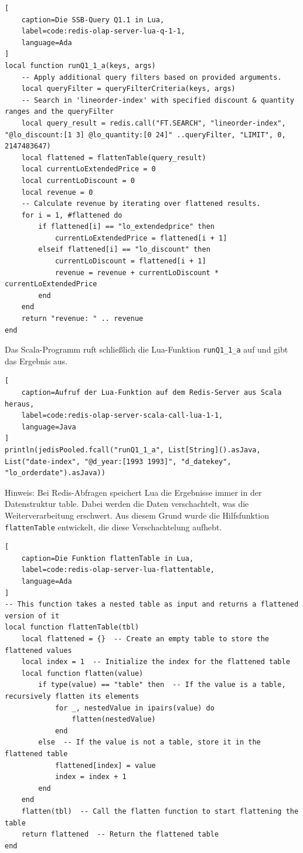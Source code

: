 \begin{lstlisting}[
    caption=Die SSB-Query Q1.1 in Lua,
    label=code:redis-olap-server-lua-q-1-1,
    language=Ada
]
local function runQ1_1_a(keys, args)
    -- Apply additional query filters based on provided arguments.
    local queryFilter = queryFilterCriteria(keys, args)
    -- Search in 'lineorder-index' with specified discount & quantity ranges and the queryFilter
    local query_result = redis.call("FT.SEARCH", "lineorder-index", "@lo_discount:[1 3] @lo_quantity:[0 24]" ..queryFilter, "LIMIT", 0, 2147483647)
    local flattened = flattenTable(query_result)
    local currentLoExtendedPrice = 0
    local currentLoDiscount = 0
    local revenue = 0
    -- Calculate revenue by iterating over flattened results.
    for i = 1, #flattened do
        if flattened[i] == "lo_extendedprice" then
            currentLoExtendedPrice = flattened[i + 1]
        elseif flattened[i] == "lo_discount" then
            currentLoDiscount = flattened[i + 1]
            revenue = revenue + currentLoDiscount * currentLoExtendedPrice
        end
    end
    return "revenue: " .. revenue
end
\end{lstlisting}

Das Scala-Programm ruft schließlich die Lua-Funktion \lstinline|runQ1_1_a| auf und gibt das Ergebnis aus.

\begin{lstlisting}[
    caption=Aufruf der Lua-Funktion auf dem Redis-Server aus Scala heraus,
    label=code:redis-olap-server-scala-call-lua-1-1,
    language=Java
]
println(jedisPooled.fcall("runQ1_1_a", List[String]().asJava, List("date-index", "@d_year:[1993 1993]", "d_datekey", "lo_orderdate").asJava))
\end{lstlisting}




Hinweis: Bei Redis-Abfragen speichert Lua die Ergebnisse immer in der Datenstruktur table. Dabei werden die Daten verschachtelt, was die Weiterverarbeitung erschwert. Aus diesem Grund wurde die Hilfsfunktion \lstinline|flattenTable| entwickelt, die diese Verschachtelung aufhebt.

\begin{lstlisting}[
    caption=Die Funktion flattenTable in Lua,
    label=code:redis-olap-server-lua-flattentable,
    language=Ada
]
-- This function takes a nested table as input and returns a flattened version of it
local function flattenTable(tbl)
    local flattened = {}  -- Create an empty table to store the flattened values
    local index = 1  -- Initialize the index for the flattened table
    local function flatten(value)
        if type(value) == "table" then  -- If the value is a table, recursively flatten its elements
            for _, nestedValue in ipairs(value) do
                flatten(nestedValue)
            end
        else  -- If the value is not a table, store it in the flattened table
            flattened[index] = value
            index = index + 1
        end
    end
    flatten(tbl)  -- Call the flatten function to start flattening the table
    return flattened  -- Return the flattened table
end
\end{lstlisting}

